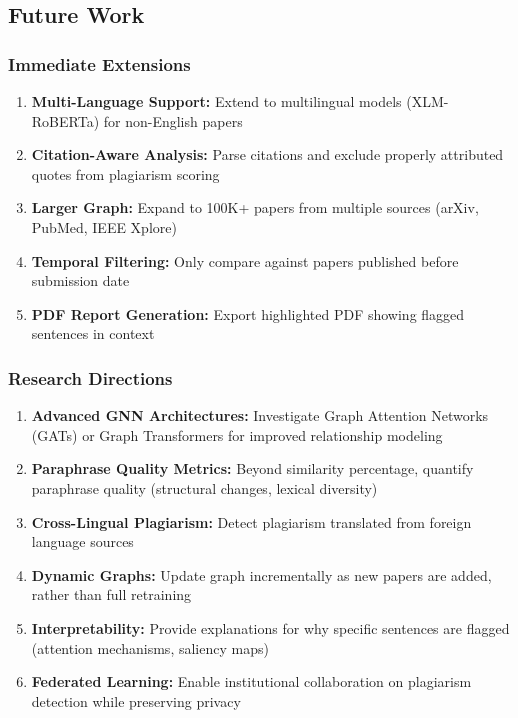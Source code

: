 \documentclass[conference]{IEEEtran}
\begin{document}
\subsection{Future Work}

\subsubsection{Immediate Extensions}
\begin{enumerate}
    \item \textbf{Multi-Language Support:} Extend to multilingual models (XLM-RoBERTa) for non-English papers
    
    \item \textbf{Citation-Aware Analysis:} Parse citations and exclude properly attributed quotes from plagiarism scoring
    
    \item \textbf{Larger Graph:} Expand to 100K+ papers from multiple sources (arXiv, PubMed, IEEE Xplore)
    
    \item \textbf{Temporal Filtering:} Only compare against papers published before submission date
    
    \item \textbf{PDF Report Generation:} Export highlighted PDF showing flagged sentences in context
\end{enumerate}

\subsubsection{Research Directions}
\begin{enumerate}
    \item \textbf{Advanced GNN Architectures:} Investigate Graph Attention Networks (GATs) or Graph Transformers for improved relationship modeling
    
    \item \textbf{Paraphrase Quality Metrics:} Beyond similarity percentage, quantify paraphrase quality (structural changes, lexical diversity)
    
    \item \textbf{Cross-Lingual Plagiarism:} Detect plagiarism translated from foreign language sources
    
    \item \textbf{Dynamic Graphs:} Update graph incrementally as new papers are added, rather than full retraining
    
    \item \textbf{Interpretability:} Provide explanations for why specific sentences are flagged (attention mechanisms, saliency maps)
    
    \item \textbf{Federated Learning:} Enable institutional collaboration on plagiarism detection while preserving privacy
\end{enumerate}
\end{document}
